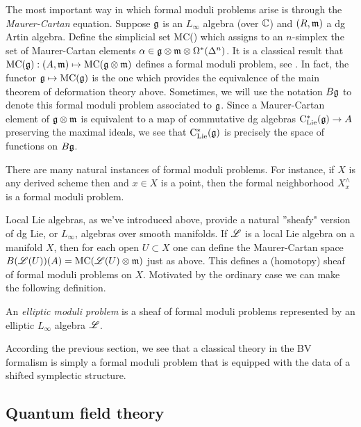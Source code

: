 The most important way in which formal moduli problems arise is through the {\em Maurer-Cartan} equation.
Suppose $\mathfrak g$ is an $L_\infty$ algebra (over $\mathbb C$) and $(R,{\mathfrak m})$ a dg Artin algebra.
Define the simplicial set
\ben
{\rm MC}(\fg \tensor \fm) 
\een
which assigns to an $n$-simplex the set of Maurer-Cartan elements $\alpha \in \mathfrak g \otimes {\mathfrak m} \otimes \Omega^*(\Delta^n)$. 
It is a classical result that ${\rm MC}(\mathfrak g) : (A, {\mathfrak m}) \mapsto {\rm MC}(\mathfrak g \otimes {\mathfrak m})$ defines a formal moduli problem, see \cite{GetzlerLie}.
In fact, the functor $\mathfrak g \mapsto {\rm MC}(\mathfrak g)$ is the one which provides the equivalence of the main theorem of deformation theory above. 
Sometimes, we will use the notation $B \mathfrak g$ to denote this formal moduli problem associated to $\mathfrak g$.
Since a Maurer-Cartan element of $\mathfrak g \otimes {\mathfrak m}$ is equivalent to a map of commutative dg algebras ${\rm C}_{{\rm Lie}}^*(\mathfrak g) \to A$ preserving the maximal ideals, we see that ${\rm C}_{{\rm Lie}}^*(\mathfrak g)$ is precisely the space of functions on $B \mathfrak g$.

\begin{rmk} 
There are many natural instances of formal moduli problems.
For instance, if $X$ is any derived scheme then and $x \in X$ is a point, then the formal neighborhood $X^{\wedge}_x$ is a formal moduli problem.
\end{rmk}

Local Lie algebras, as we've introduced above, provide a natural ''sheafy" version of dg Lie, or $L_\infty$, algebras over smooth manifolds. 
If $\mathscr L$ is a local Lie algebra on a manifold $X$, then for each open $U \subset X$ one can define the Maurer-Cartan space $B(\mathscr L(U))(A) = {\rm MC}(\mathscr L(U) \otimes {\mathfrak m})$ just as above.
This defines a (homotopy) sheaf of formal moduli problems on $X$. 
Motivated by the ordinary case we can make the following definition.

\begin{dfn} 
An {\em elliptic moduli problem} is a sheaf of formal moduli problems represented by an elliptic $L_\infty$ algebra $\mathscr L$. 
\end{dfn}

According the previous section, we see that a classical theory in the BV formalism is simply a formal moduli problem that is equipped with the data of a shifted symplectic structure. 

\subsection{Quantum field theory}

